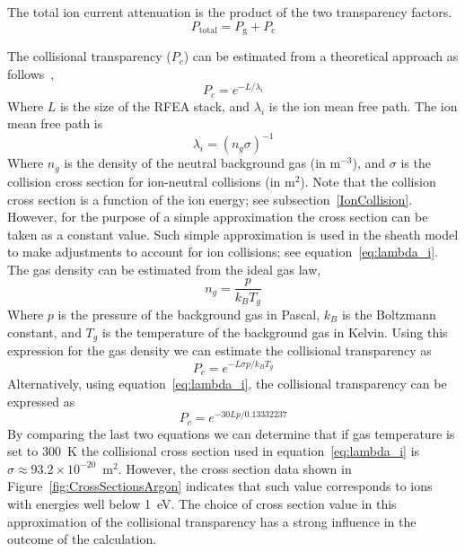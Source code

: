 The total ion current attenuation is the product of the two transparency factors.
\begin{equation}
P_{\text{total}} = P_\text{g} + P_\text{c}
\end{equation}

The collisional transparency ($P_c$) can be estimated from a theoretical approach as follows~\cite{Baloniak2010}, 
\begin{equation}
P_c = e^{- L / \lambda_i} 
\end{equation}
Where $L$ is the size of the RFEA stack, and $\lambda_i$ is the ion mean free path. The ion mean free path is
\begin{equation}
\lambda_i = (n_g \sigma)^{-1}
\end{equation}
Where $n_g$ is the density of the neutral background gas (in m$^{-3}$), and $\sigma$ is the collision cross section for ion-neutral collisions (in m$^2$). Note that the collision cross section is a function of the ion energy; see subsection~\ref{IonCollision}. However, for the purpose of a simple approximation the cross section can be taken as a constant value. Such simple approximation is used in the sheath model to make adjustments to account for ion collisions; see equation~\ref{eq:lambda_i}. The gas density can be estimated from the ideal gas law, 
\begin{equation}
n_g = \frac{p}{k_B T_g}
\end{equation}    
Where $p$ is the pressure of the background gas in Pascal, $k_B$ is the Boltzmann constant, and $T_g$ is the temperature of the background gas in Kelvin. Using this expression for the gas density we can estimate the collisional transparency as
\begin{equation}
P_c = e^{- L \sigma p / k_B T_g}
\end{equation}
Alternatively, using equation~\ref{eq:lambda_i}, the collisional transparency can be expressed as
\begin{equation}\label{eq:CollisionalTrasparency}
P_c = e^{- 30 L p / 0.13332237}
\end{equation}
By comparing the last two equations we can determine that if gas temperature is set to 300~K the collisional cross section used in equation~\ref{eq:lambda_i} is $\sigma \approx 93.2 \times 10^{-20}$~m$^2$. However, the cross section data shown in Figure~\ref{fig:CrossSectionsArgon} indicates that such value corresponds to ions with energies well below 1~eV. The choice of cross section value in this approximation of the collisional transparency has a strong influence in the outcome of the calculation.  

